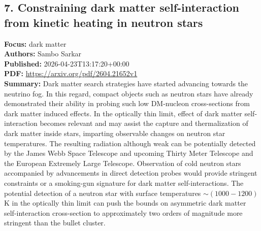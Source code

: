 \documentclass[11pt]{article}
\begin{document}
\subsection*{7. Constraining dark matter self-interaction from kinetic heating in neutron stars}
\textbf{Focus:} dark matter\\
\textbf{Authors:} Sambo Sarkar\\
\textbf{Published:} 2026-04-23T13:17:20+00:00\\
\textbf{PDF:} \href{https://arxiv.org/pdf/2604.21652v1}{https://arxiv.org/pdf/2604.21652v1}\\
\textbf{Summary:}
Dark matter search strategies have started advancing towards the neutrino fog. In this regard, compact objects such as neutron stars have already demonstrated their ability in probing such low DM-nucleon cross-sections from dark matter induced effects. In the optically thin limit, effect of dark matter self-interaction becomes relevant and may assist the capture and thermalization of dark matter inside stars, imparting observable changes on neutron star temperatures. The resulting radiation although weak can be potentially detected by the James Webb Space Telescope and upcoming Thirty Meter Telescope and the European Extremely Large Telescope. Observation of cold neutron stars accompanied by advancements in direct detection probes would provide stringent constraints or a smoking-gun signature for dark matter self-interactions. The potential detection of a neutron star with surface temperatures $\sim (1000 - 1200)$ K in the optically thin limit can push the bounds on asymmetric dark matter self-interaction cross-section to approximately two orders of magnitude more stringent than the bullet cluster.
\newpage
\end{document}
